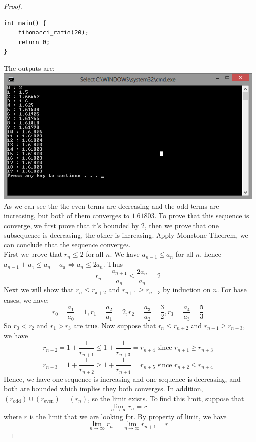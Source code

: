 \documentclass[10pt,letterpaper]{article}
\begin{document}
\begin{enumerate}[(i)]
\begin{proof}
\begin{verbatim}
int main() {
	fibonacci_ratio(20);	
	return 0;
}
\end{verbatim} 
The outputs are: \\
\includegraphics[scale=0.5]{hw5.png} \\
		As we can see the the even terms are decreasing and the odd terms are increasing, but both
		of them converges to $1.61803$. To prove that this sequence is converge, we first prove
		that it's bounded by $2$, then we prove that one subsequence is decreasing, the other is
		increasing. Apply Monotone Theorem, we can conclude that the sequence converges. \\
		First we prove that $r_n \leq 2$ for all $n$. We have $a_{n-1} \leq a_{n}$ for all $n$,
		hence $a_{n-1} + a_{n} \leq a_{n} + a_{n} \Leftrightarrow a_n \leq 2a_{n}$. Thus
			$$r_n = \dfrac{a_{n+1}}{a_n} \leq \dfrac{2a_n}{a_n} = 2$$
		Next we will show that $r_{n} \leq r_{n+2}$ and $r_{n+1} \geq r_{n+3}$ by induction on $n$.
		For base cases, we have:
		$$r_0 = \dfrac{a_1}{a_0} = 1, r_1 = \dfrac{a_2}{a_1} = 2, r_2 = \dfrac{a_3}{a_2} = \dfrac{3}{2}, r_3 = \dfrac{a_4}{a_3}
		= \dfrac{5}{3}$$
		So $r_0 < r_2$ and $r_1 > r_3$ are true. Now suppose that $r_{n} \leq r_{n+2}$ and $r_{n+1} \geq r_{n+3}$, we have
		$$r_{n+2} = 1 + \dfrac{1}{r_{n+1}} \leq 1 + \dfrac{1}{r_{n+3}} = r_{n+4} \text{ since } r_{n+1} \geq r_{n+3}$$
		$$r_{n+3} = 1 + \dfrac{1}{r_{n+2}} \geq 1 + \dfrac{1}{r_{n+4}} = r_{n+5} \text{ since } r_{n+2} \leq r_{n+4}$$
		Hence, we have one sequence is increasing and one sequence is decreasing, and both are bounded which implies
		they both converges. In addition, $(r_{\text{odd}}) \cup (r_{\text{even}}) = (r_n)$, so the limit exists.
		To find this limit, suppose that 
		$$\displaystyle\lim_{n\to\infty} r_n = r$$
		where $r$ is the limit that we are looking for. By property of limit, we have
		$$\displaystyle\lim_{n\to\infty} r_n = \displaystyle\lim_{n\to\infty} r_{n+1} = r$$

\end{proof}
\end{enumerate}
\end{document}
